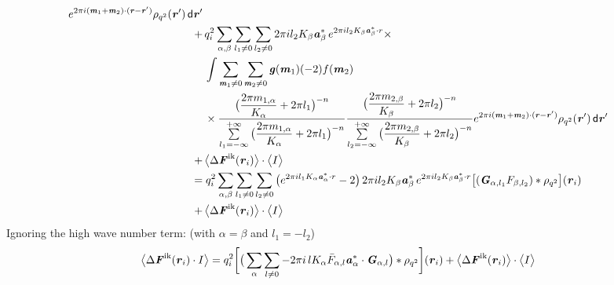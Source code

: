 \documentclass[aps,pre,preprint]{revtex4}
\renewcommand{\v}[1]{\textbf{\textit{#1}}}
\renewcommand{\d}[1]{\textsf{#1}}
\begin{document}
\begin{align}
  e^{2\pi i(\v m_1+\v m_2)\cdot(\v r - \v r')} \rho_{q^2}(\v r') \,\d d\v r' \\\nonumber
  +&\,
  q^2_i
  \sum_{\alpha, \beta}\sum_{l_1\neq 0}\sum_{l_2\neq 0}
  2\pi i l_2K_\beta \v a_\beta ^\ast\,e^{2\pi i l_2 K_\beta \v a_\beta^\ast\cdot r} \times \\\nonumber
  &\,
  \int
  \sum_{\v m_1\neq 0}\sum_{\v m_2\neq 0}
  \v g(\v m_1) (-2) f(\v m_2) \\\nonumber
  &\,\times
  \frac
  {\big(\dfrac{2\pi m_{1,\alpha}}{K_\alpha} + 2\pi l_1\big)^{-n}}
  {\sum\limits_{l_1=-\infty}^{+\infty}
    \big(\dfrac{2\pi m_{1,\alpha}}{K_\alpha} + 2\pi l_1\big)^{-n}}
  \frac
  {\big(\dfrac{2\pi m_{2,\beta}}{K_\beta} + 2\pi l_2\big)^{-n}}
  {\sum\limits_{l_2=-\infty}^{+\infty}
    \big(\dfrac{2\pi m_{2,\beta}}{K_\beta} + 2\pi l_2\big)^{-n}}
  e^{2\pi i(\v m_1+\v m_2)\cdot(\v r - \v r')} \rho_{q^2}(\v r') \,\d d\v r' \\ \nonumber
  + &\,
  \big\langle
  \Delta\v F^{\textrm{ik}}(\v r_i)
  \big\rangle
  \cdot 
  \big\langle
  I
  \big\rangle   \\\nonumber
  =&\;
  q^2_i
  \sum_{\alpha, \beta}\sum_{l_1\neq 0}\sum_{l_2\neq 0}
  \big(
  e^{2\pi i l_1 K_\alpha\v a_\alpha^\ast\cdot r} - 2
  \big)\,
  2\pi i l_2K_\beta \v a_\beta ^\ast
  \,e^{2\pi i l_2 K_\beta \v a_\beta^\ast\cdot r}
  \big[
  (\v G_{\alpha,l_1} F_{\beta,l_2}) \ast \rho_{q^2}
  \big] (\v r_i) \\
  + &\,
  \big\langle
  \Delta\v F^{\textrm{ik}}(\v r_i)
  \big\rangle
  \cdot 
  \big\langle
  I
  \big\rangle   
\end{align}
Ignoring the high wave number term: (with $\alpha = \beta$ and $l_1 = -l_2$)
\begin{align}
  \big\langle
  \Delta\v F^{\textrm{ik}}(\v r_i)\cdot I
  \big\rangle
  =&\;
  q^2_i
  \bigg[
  \big(
  \sum_{\alpha}\sum_{l\neq 0}
  -2\pi i\,l K_\alpha \bar F_{\alpha,l}\v a_\alpha ^\ast\cdot\v G_{\alpha,l} 
  \big)\ast \rho_{q^2}
  \bigg] (\v r_i) +
  \big\langle
  \Delta\v F^{\textrm{ik}}(\v r_i)
  \big\rangle
  \cdot 
  \big\langle
  I
  \big\rangle   
\end{align}
\end{document}
